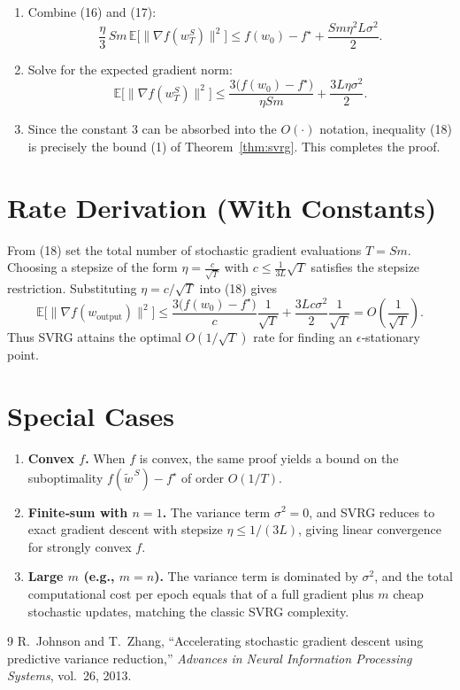 \documentclass{article}
\begin{document}
\begin{enumerate}[label=[Step \arabic*], leftmargin=*]
\item Combine (16) and (17):
\[
\frac{\eta}{3}\,Sm\,
\mathbb{E}\!\bigl[\|\nabla f(w_{T}^{S})\|^{2}\bigr]
\le
f(w_{0})-f^{\star}
+\frac{Sm\eta^{2}L\sigma^{2}}{2}.
\]

\item Solve for the expected gradient norm:
\[
\boxed{
\mathbb{E}\!\bigl[\|\nabla f(w_{T}^{S})\|^{2}\bigr]
\le
\frac{3\bigl(f(w_{0})-f^{\star}\bigr)}{\eta Sm}
+\frac{3L\eta\sigma^{2}}{2}}.
\tag{18}
\]

\item Since the constant $3$ can be absorbed into the $O(\cdot)$ notation, inequality (18) is precisely the bound (1) of Theorem~\ref{thm:svrg}.  This completes the proof.
\end{enumerate}

\section*{Rate Derivation (With Constants)}
From (18) set the total number of stochastic gradient evaluations $T=Sm$.  Choosing a stepsize of the form $\eta=\frac{c}{\sqrt{T}}$ with $c\le\frac{1}{3L}\sqrt{T}$ satisfies the stepsize restriction.  Substituting $\eta=c/\sqrt{T}$ into (18) gives
\[
\mathbb{E}\!\bigl[\|\nabla f(w_{\text{output}})\|^{2}\bigr]
\le
\frac{3\bigl(f(w_{0})-f^{\star}\bigr)}{c}\frac{1}{\sqrt{T}}
+\frac{3L c\sigma^{2}}{2}\frac{1}{\sqrt{T}}
=
O\!\left(\frac{1}{\sqrt{T}}\right).
\]
Thus SVRG attains the optimal $O(1/\sqrt{T})$ rate for finding an $\epsilon$‑stationary point.

\section*{Special Cases}
\begin{enumerate}[label=\alph*)]
\item \textbf{Convex $f$.} When $f$ is convex, the same proof yields a bound on the suboptimality $f(\tilde w^{\,S})-f^{\star}$ of order $O(1/T)$.
\item \textbf{Finite‑sum with $n=1$.} The variance term $\sigma^{2}=0$, and SVRG reduces to exact gradient descent with stepsize $\eta\le1/(3L)$, giving linear convergence for strongly convex $f$.
\item \textbf{Large $m$ (e.g., $m=n$).} The variance term is dominated by $\sigma^{2}$, and the total computational cost per epoch equals that of a full gradient plus $m$ cheap stochastic updates, matching the classic SVRG complexity.
\end{enumerate}

\begin{thebibliography}{9}
R.~Johnson and T.~Zhang, ``Accelerating stochastic gradient descent using
  predictive variance reduction,'' \emph{Advances in Neural Information
  Processing Systems}, vol.~26, 2013.
\end{thebibliography}
\end{document}
